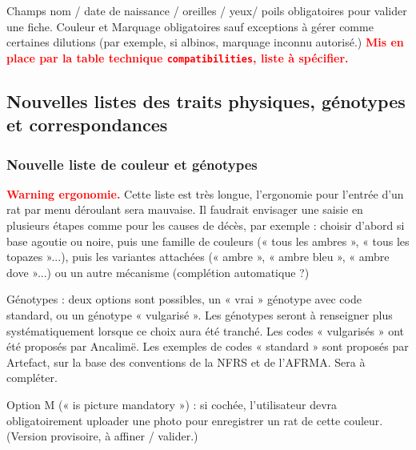 ﻿\documentclass[a4paper,10pt]{article}
\newcommand\desire[1]{\noindent\textbf{\textcolor{red}{#1}}}
\begin{document}
Champs nom / date de naissance / oreilles / yeux/ poils obligatoires pour valider une fiche. Couleur et Marquage obligatoires sauf exceptions à gérer comme certaines dilutions (par exemple, si albinos, marquage inconnu autorisé.) \desire{Mis en place par la table technique \texttt{compatibilities}, liste à spécifier.}

\subsection{Nouvelles listes des traits physiques, génotypes et correspondances}

\subsubsection{Nouvelle liste de couleur et génotypes}
\desire{Warning ergonomie.} Cette liste est très longue, l'ergonomie pour l'entrée d'un rat par menu déroulant sera mauvaise. Il faudrait envisager une saisie en plusieurs étapes comme pour les causes de décès, par exemple : choisir d'abord si base agoutie ou noire, puis une famille de couleurs (« tous les ambres », « tous les topazes »...), puis les variantes attachées (« ambre », « ambre bleu », « ambre dove »...) ou un autre mécanisme (complétion automatique ?)   

Génotypes : deux options sont possibles, un « vrai » génotype avec code standard, ou un génotype « vulgarisé ». Les génotypes seront à renseigner plus systématiquement lorsque ce choix aura été tranché. Les codes « vulgarisés » ont été proposés par Ancalimë. Les exemples de codes « standard » sont proposés par Artefact, sur la base des conventions de la NFRS et de l'AFRMA. Sera à compléter.  

Option M (« is picture mandatory ») : si cochée, l'utilisateur devra obligatoirement uploader une photo pour enregistrer un rat de cette couleur. (Version provisoire, à affiner / valider.)
\end{document}
